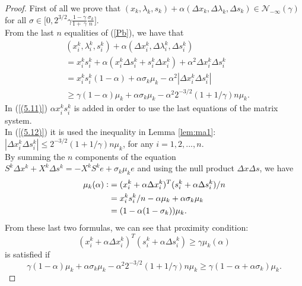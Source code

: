 \documentclass[a4paper,10 pt,titlepage,twoside]{book}
\theoremstyle{plain}
\theoremstyle{definition}
\theoremstyle{remark}
\begin{document}
\begin{proof}
	First of all we prove that $(x_{k}, \lambda_{k}, s_{k})+\alpha(\Delta x_{k},\Delta \lambda_{k},\Delta s_{k})\in\mathcal{N}_{-\infty}(\gamma)$ for all $\sigma \in \bigg[0,2^{3/2}\gamma \frac{1 - \gamma}{1 +\ \gamma}\frac{\sigma_{k}}{n}\bigg]$.\\
	
	From the last $n$ equalities of (\ref{Pb}), we have that 
	\begin{align}&(x_{i}^{k}, \lambda_{i}^{k}, s_{i}^{k})+\alpha(\Delta x_{i}^{k},\Delta \lambda_{i}^{k},\Delta s_{i}^{k})\\ 
	 &=x_{i}^{k}s_{i}^{k} + \alpha(x_{i}^{k} \Delta s_{i}^{k} + s_{i}^{k} \Delta x_{i}^{k})+\alpha^{2}\Delta x_{i}^{k} \Delta s_{i}^{k} \\
	&=x_{i}^{k}s_{i}^{k}(1 - \alpha) + \alpha \sigma_{k}\mu_{k}-\alpha^{2}|\Delta x_{i}^{k} \Delta s_{i}^{k}| \label{(5.11)}\\
	&\geq \gamma(1 - \alpha)\mu_{k} + \alpha \sigma_{k}\mu_{k}-\alpha^{2}2^{-3/2}(1 + 1/ \gamma)n\mu_{k} \label{(5.12)}.
	\end{align}
	In (\ref{(5.11)}) $\alpha x_{i}^{k}s_{i}^{k}$ is added in order to use the last equations of the matrix system.\\ 
	In (\ref{(5.12)}) it is used the inequality in Lemma \ref{lem:ma1}: $|\Delta x_{i}^{k}\Delta s_{i}^{k}|\leq2^{-3/2}(1 + 1/\gamma)n\mu_{k}$, for any $i = 1,2,...,n$. \\
	By summing the $n$ components of the equation $S^{k}\Delta x^{k} + X^{k} \Delta s^{k} = -X^{k}S^{k}e + \sigma_{k} \mu_{k}e$ and using the null product $\Delta x \Delta s$, we have
	\begin{align*}\mu_{k}(\alpha)\vcentcolon&=(x_{i}^{k} + \alpha\Delta x_{i}^{k})^{T}(s_{i}^{k} + \alpha\Delta s_{i}^{k})/n\\ 
	&=x_{i}^{k}s_{i}^{k}/n - \alpha \mu_{k}+\alpha \sigma_{k} \mu_{k} \\
	&=(1-\alpha(1-\sigma_{k}))\mu_{k}.
	\end{align*}
	From these last two formulas, we can see that proximity condition:
	\begin{equation*}
		(x_{i}^{k} + \alpha\Delta x_{i}^{k})^{T}(s_{i}^{k} + \alpha\Delta s_{i}^{k}) \geq \gamma\mu_{k}(\alpha)
	\end{equation*} is satisfied if \begin{equation*}
	\gamma(1-\alpha)\mu_{k} + \alpha\sigma_{k}\mu_{k} - \alpha^{2}2^{-3/2}(1 + 1/\gamma)n\mu_{k}\geq \gamma(1 - \alpha +\alpha\sigma_{k})\mu_{k}.

\end{equation*}
\end{proof}
\end{document}
